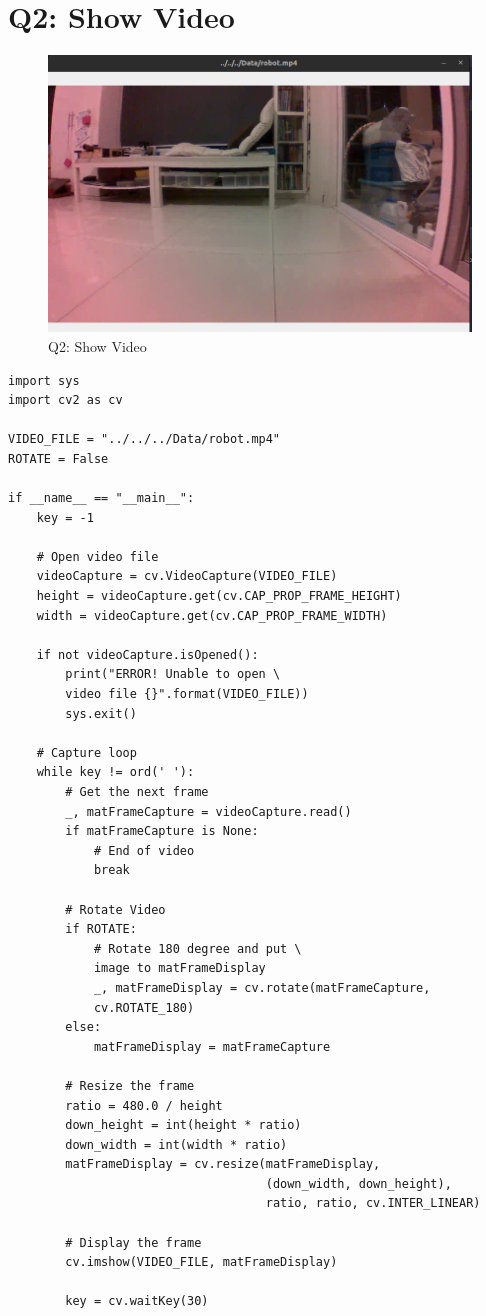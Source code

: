 \documentclass[a4paper,12pt]{article}
\begin{document}
\section{Q2: Show Video}
\begin{figure}
	\caption{Q2: Show Video}
	\includegraphics[scale=0.45]{img/Q2.png}
\end{figure}
\begin{lstlisting}
import sys
import cv2 as cv

VIDEO_FILE = "../../../Data/robot.mp4"
ROTATE = False

if __name__ == "__main__":
    key = -1

    # Open video file
    videoCapture = cv.VideoCapture(VIDEO_FILE)
    height = videoCapture.get(cv.CAP_PROP_FRAME_HEIGHT)
    width = videoCapture.get(cv.CAP_PROP_FRAME_WIDTH)

    if not videoCapture.isOpened():
        print("ERROR! Unable to open \
		video file {}".format(VIDEO_FILE))
        sys.exit()

    # Capture loop
    while key != ord(' '):
        # Get the next frame
        _, matFrameCapture = videoCapture.read()
        if matFrameCapture is None:
            # End of video
            break

        # Rotate Video
        if ROTATE:
            # Rotate 180 degree and put \
			image to matFrameDisplay
            _, matFrameDisplay = cv.rotate(matFrameCapture, 
			cv.ROTATE_180)
        else:
            matFrameDisplay = matFrameCapture

        # Resize the frame
        ratio = 480.0 / height
        down_height = int(height * ratio)
        down_width = int(width * ratio)
        matFrameDisplay = cv.resize(matFrameDisplay,
                                    (down_width, down_height),
                                    ratio, ratio, cv.INTER_LINEAR)

        # Display the frame
        cv.imshow(VIDEO_FILE, matFrameDisplay)

        key = cv.waitKey(30)
\end{lstlisting}
\end{document}

